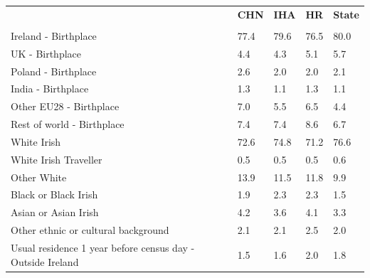 \documentclass{article}
\begin{document}
\pagebreak
\begin{table}[h]	
\centering
		\begin{tabular}{KTTTT}
  \hline
& \textbf{CHN} & \textbf{IHA} & \textbf{HR}& \textbf{State}\\ 
  \hline
    \\ 
    \hline
Ireland - Birthplace & 77.4& 79.6& 76.5& 80.0\\
UK - Birthplace & 4.4& 4.3& 5.1& 5.7\\
Poland - Birthplace & 2.6& 2.0& 2.0& 2.1\\
India - Birthplace & 1.3& 1.1& 1.3& 1.1\\
Other EU28 - Birthplace & 7.0& 5.5& 6.5& 4.4\\
Rest of world - Birthplace & 7.4& 7.4& 8.6& 6.7\\
    \hline
White Irish & 72.6& 74.8& 71.2& 76.6\\
White Irish Traveller & 0.5& 0.5& 0.5& 0.6\\
Other White & 13.9& 11.5& 11.8&  9.9\\
Black or Black Irish & 1.9& 2.3& 2.3& 1.5\\
Asian or Asian Irish & 4.2& 3.6& 4.1& 3.3\\
Other ethnic or cultural background & 2.1& 2.1& 2.5& 2.0\\
    \hline
Usual residence 1 year before census day - Outside Ireland & 1.5& 1.6& 2.0& 1.8\\


\end{tabular}
\end{table}
\end{document}
